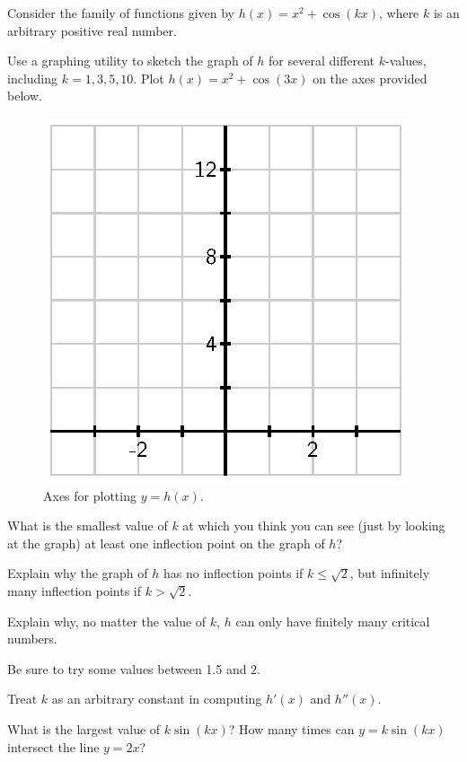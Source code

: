 \begin{activity} \label{A:3.1.3}  
Consider the family of functions given by $h(x) = x^2 + \cos(kx)$, where $k$ is an arbitrary positive real number.
	\ba
	  \item Use a graphing utility to sketch the graph of $h$ for several different $k$-values, including $k = 1,3,5,10$.  Plot $h(x) = x^2 + \cos(3x)$ on the axes provided below.  
\begin{figure}[h]
\begin{center}
\includegraphics{figures/3_1_Act3.eps} 
\end{center}
\caption{Axes for plotting $y = h(x)$.} \label{F:3.1.Act3}
\end{figure}
	  What is the smallest value of $k$ at which you think you can see (just by looking at the graph) at least one inflection point on the graph of $h$?
	  \item Explain why the graph of $h$ has no inflection points if $k \le \sqrt{2}$, but infinitely many inflection points if $k > \sqrt{2}$.
	  \item Explain why, no matter the value of $k$, $h$ can only have finitely many critical numbers.
	\ea
\end{activity}
\begin{smallhint}
	\ba
		\item Be sure to try some values between 1.5 and 2.
		\item Treat $k$ as an arbitrary constant in computing $h'(x)$ and $h''(x)$.  
		\item What is the largest value of $k\sin(kx)$?  How many times can $y = k\sin(kx)$ intersect the line $y = 2x$?
	\ea
\end{smallhint}
